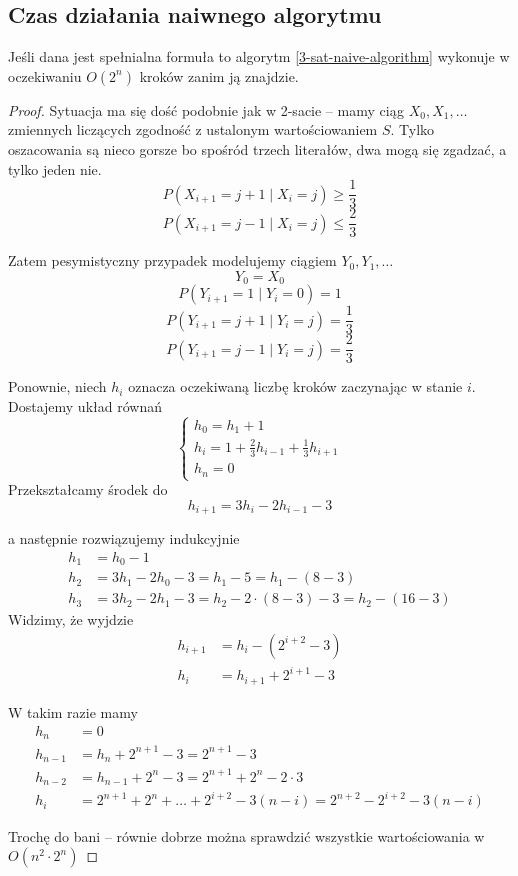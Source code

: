 \subsection{Czas działania naiwnego algorytmu}
\begin{theorem}
    Jeśli dana jest spełnialna formuła to algorytm \ref{3-sat-naive-algorithm} wykonuje w oczekiwaniu \( O(2^n) \) kroków zanim ją znajdzie.
\end{theorem}
\begin{proof}

Sytuacja ma się dość podobnie jak w 2-sacie -- mamy ciąg \( X_0, X_1, \dots \) zmiennych
liczących zgodność z ustalonym wartościowaniem \( S \).
Tylko oszacowania są nieco gorsze bo spośród trzech literałów, dwa mogą się zgadzać, a tylko jeden nie.
\[
    P(X_{i+1} = j + 1 \mid X_i = j) \geq \frac{1}{3}
\]
\[
    P(X_{i+1} = j - 1 \mid X_i = j) \leq \frac{2}{3}
\]

Zatem pesymistyczny przypadek modelujemy ciągiem \( Y_0, Y_1, \dots \)
     \[
        Y_0 = X_0
    \]
    \[
        P(Y_{i+1} = 1 \mid Y_i = 0) = 1
    \]
    \[
        P(Y_{i+1} = j + 1 \mid Y_i = j) = \frac{1}{3}
    \]
    \[
        P(Y_{i+1} = j - 1 \mid Y_i = j) = \frac{2}{3}
    \]

Ponownie, niech \( h_i \) oznacza oczekiwaną liczbę kroków zaczynając w stanie \( i \).
Dostajemy układ równań
\[
    \begin{cases}
        h_0 = h_1 + 1 \\
        h_i = 1 + \frac{2}{3} h_{i - 1} + \frac{1}{3} h_{i + 1} \\
        h_n = 0
    \end{cases}
\]
Przekształcamy środek do
\[
    h_{i + 1} = 3h_i - 2h_{i - 1} - 3
\]

a następnie rozwiązujemy indukcyjnie
\begin{align*}
    h_1 &= h_0 - 1 \\
    h_2 &= 3h_1 - 2h_0 - 3 = h_1 - 5  = h_1 - (8 - 3)\\
    h_3 &= 3h_2 - 2h_1 - 3 = h_2 - 2 \cdot(8 - 3) - 3 = h_2 - (16 - 3)
\end{align*}
Widzimy, że wyjdzie
\begin{align*}
    h_{i+1} &= h_i - (2^{i+2} - 3) \\
    h_i &= h_{i+1} + 2^{i+1} - 3
\end{align*}

W takim razie mamy
\begin{align*}
    h_n &= 0 \\
    h_{n-1} &= h_n + 2^{n+1} - 3 = 2^{n+1} - 3 \\
    h_{n-2} &= h_{n-1} + 2^n - 3 = 2^{n+1} + 2^n - 2\cdot 3 \\
    h_i &= 2^{n+1} + 2^n + \dots + 2^{i+2} - 3(n - i) = 2^{n+2} - 2^{i+2} - 3(n - i)
\end{align*}

Trochę do bani -- równie dobrze można sprawdzić wszystkie wartościowania w \( O(n^2 \cdot 2^n) \)
\end{proof}

